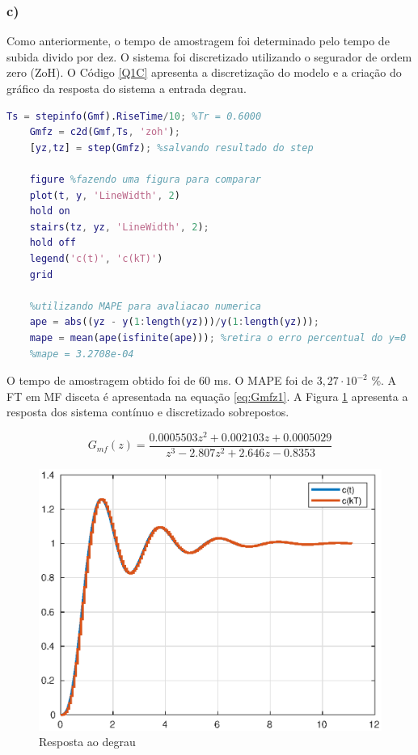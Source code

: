     \newpage    
    \subsubsection*{c)}

        Como anteriormente, o tempo de amostragem foi determinado pelo tempo de subida divido por dez. 
        O sistema foi discretizado utilizando o segurador de ordem zero (ZoH). O Código \ref{Q1C} apresenta
        a discretização do modelo e a criação do gráfico da resposta do sistema a entrada degrau.

        \begin{lstlisting}[language=Matlab,label=Q1C,caption=Análise da estabilidade]
    Ts = stepinfo(Gmf).RiseTime/10; %Tr = 0.6000
    Gmfz = c2d(Gmf,Ts, 'zoh');
    [yz,tz] = step(Gmfz); %salvando resultado do step

    figure %fazendo uma figura para comparar
    plot(t, y, 'LineWidth', 2)
    hold on
    stairs(tz, yz, 'LineWidth', 2);
    hold off
    legend('c(t)', 'c(kT)')
    grid

    %utilizando MAPE para avaliacao numerica
    ape = abs((yz - y(1:length(yz)))/y(1:length(yz))); 
    mape = mean(ape(isfinite(ape))); %retira o erro percentual do y=0
    %mape = 3.2708e-04
        \end{lstlisting}

    O tempo de amostragem obtido foi de 60 ms. O MAPE foi de $3,27 \cdot 10^{-2}$ \%.
    A FT em MF disceta é apresentada na equação \ref{eq:Gmfz1}.
    A Figura \ref{fig:Stepctds1} apresenta a resposta dos sistema contínuo e discretizado sobrepostos. 

    \begin{equation}
        G_{mf}(z) = \frac{0.0005503 z^2 + 0.002103 z + 0.0005029}{z^3 - 2.807 z^2 + 2.646 z - 0.8353}
        \label{eq:Gmfz1}
    \end{equation}


    \begin{figure}[!ht]
        \centering
        \includegraphics[width = 0.75\linewidth]{Figuras/ProblemasPI/Problema1/resposta_ao_degrau.eps}
        \caption{Resposta ao degrau}
        \label{fig:Stepctds1}                   
    \end{figure}

